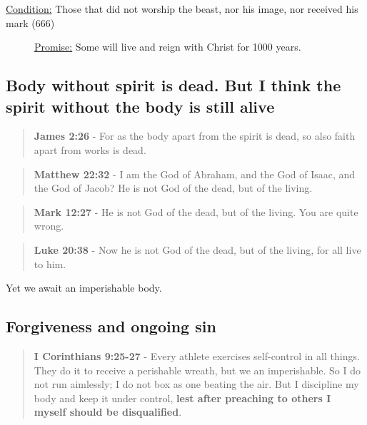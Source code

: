 \documentclass[11pt]{article}
\begin{document}
\begin{description}
\item[{\uline{Condition:} Those that did not worship the beast, nor his image, nor received his mark (666)}] \uline{Promise:} Some will live and reign with Christ for 1000 years.
\end{description}

\subsection{Body without spirit is dead. But I think the spirit without the body is still alive}
\label{sec:org65e3f8d}
\begin{quote}
\textbf{James 2:26} - For as the body apart from the spirit is dead, so also faith apart from works is dead.
\end{quote}

\begin{quote}
\textbf{Matthew 22:32} - I am the God of Abraham, and the God of Isaac, and the God of Jacob? He is not God of the dead, but of the living.
\end{quote}

\begin{quote}
\textbf{Mark 12:27} - He is not God of the dead, but of the living. You are quite wrong.
\end{quote}

\begin{quote}
\textbf{Luke 20:38} - Now he is not God of the dead, but of the living, for all live to him.
\end{quote}

Yet we await an imperishable body.

\subsection{Forgiveness and ongoing sin}
\label{sec:orga14ee6b}
\begin{quote}
\textbf{I Corinthians 9:25-27} - Every athlete exercises self-control in all things. They do it to receive a perishable wreath, but we an imperishable. So I do not run aimlessly; I do not box as one beating the air. But I discipline my body and keep it under control, \textbf{lest after preaching to others I myself should be disqualified}.
\end{quote}
\end{document}
